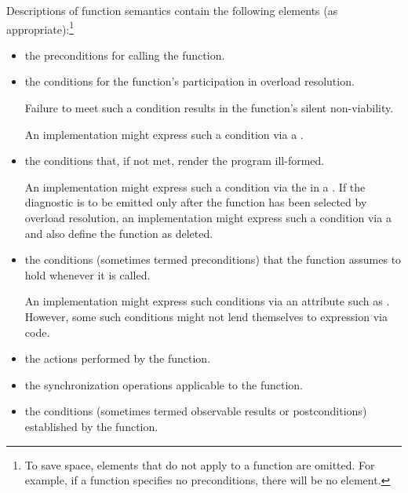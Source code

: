 \pnum
Descriptions of function semantics contain the following elements (as
appropriate):\footnote{To save space, elements that do not apply to a function are omitted.
For example, if a function specifies no
preconditions, there will be no \expects element.}

\begin{itemize}
\item
\requires the preconditions for calling the function.

\item
\constraints the conditions for the function's participation
in overload resolution.
\begin{note}
Failure to meet such a condition results in the function's silent non-viability.
\end{note}
\begin{example}
An implementation might express such a condition
via a .
\end{example}

\item
\mandates the conditions that, if not met, render the program ill-formed.
\begin{example}
An implementation might express such a condition
via the 
in a .
If the diagnostic is to be emitted only after the function
has been selected by overload resolution,
an implementation might express such a condition
via a 
and also define the function as deleted.
\end{example}

\item
\expects the conditions (sometimes termed preconditions)
that the function assumes to hold whenever it is called.
\begin{example}
An implementation might express such conditions
via an attribute such as \tcode{[[expects]]}.
However, some such conditions might not lend themselves
to expression via code.
\end{example}

\item
\effects the actions performed by the function.

\item
\sync the synchronization operations applicable to the function.

\item
\ensures the conditions (sometimes termed observable results or postconditions)
established by the function.


\end{itemize}
